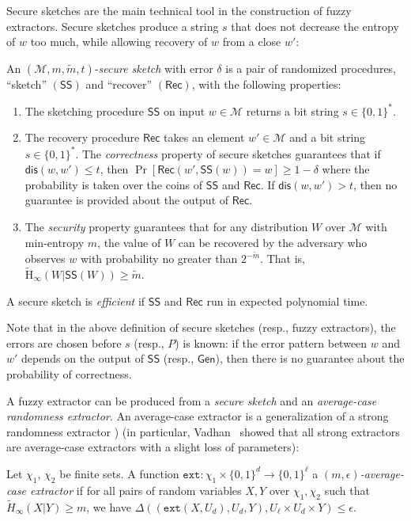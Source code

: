 \documentclass{llncs}
\newcommand{\class}[1]{{\ensuremath{\mathsf{#1}}}}
\newcommand{\gen}{\ensuremath{\class{Gen}}\xspace}
\newcommand{\sketch}{\ensuremath{\class{SS}}\xspace}
\newcommand{\rec}{\ensuremath{\class{Rec}}\xspace}
\newcommand{\dis}{\ensuremath{\mathsf{dis}}}
\newcommand{\Hav}{\tilde{\mathrm{H}}_\infty}
\newcommand{\ext}{\ensuremath{\mathtt{ext}}}
\begin{document}
Secure sketches are the main technical tool in the construction of fuzzy extractors.  Secure sketches produce a string $s$ that does not decrease the entropy of $w$ too much, while allowing recovery of $w$ from a  close $w'$:
\begin{definition}
\label{def:secure sketch}
An $(\mathcal{M},m, \tilde{m}, t)$-\emph{secure sketch} with error $\delta$ is a pair of randomized procedures, ``sketch'' $(\sketch)$ and ``recover'' $(\rec)$, with the following properties:
\begin{enumerate}
\item The sketching procedure \sketch on input $w\in\mathcal{M}$ returns a bit string $s\in\{0,1\}^*$.
\item The recovery procedure \rec takes an element $w'\in\mathcal{M}$ and a bit string $s\in\{0,1\}^*$.  The \emph{correctness} property of secure sketches guarantees that if $\dis(w,w')\leq t$, then $\Pr[\rec(w',\sketch(w))=w]\geq 1-\delta$ where the probability is taken over the coins of $\sketch$ and $\rec$.  If $\dis(w,w')>t$, then no guarantee is provided about the output of \rec.
\item The \emph{security} property guarantees that for any distribution $W$ over $\mathcal{M}$ with min-entropy $m$, the value of $W$ can be recovered by the adversary who observes $w$ with probability no greater than $2^{-\tilde{m}}$.  That is, $\Hav(W|\sketch(W))\geq \tilde{m}$.
\end{enumerate}
A secure sketch is \emph{efficient} if \sketch and \rec run in expected polynomial time. 
\end{definition}

Note that in the above definition of secure sketches (resp., fuzzy extractors), the errors are chosen before $s$ (resp., $P$) is known: if the error pattern between $w$ and $w'$ depends on the output of $\sketch$ (resp., $\gen$), then there is no guarantee about the probability of correctness.


A fuzzy extractor can be produced from a \emph{secure sketch} and an \emph{average-case randomness extractor}. An average-case extractor is a generalization of a strong randomness extractor \cite[Definition 2]{nisan1993randomness}) (in particular, Vadhan~\cite[Problem 6.8]{Vad12} showed that all strong extractors are average-case extractors with a slight loss of parameters):
\begin{definition}
Let $\chi_1$, $\chi_2$ be finite sets.
A function $\ext: \chi_1\times \{0,1\}^d \rightarrow \{0,1\}^\ell$ a \emph{$(m, \epsilon)$-average-case extractor} if for all pairs
of random variables $X, Y$ over $\chi_1, \chi_2$ such that
$\tilde{H}_\infty(X|Y) \ge m$, we have $\Delta((\ext(X, U_d), U_d, Y), U_\ell\times
U_d \times Y) \le \epsilon$.
\end{definition}
\end{document}
